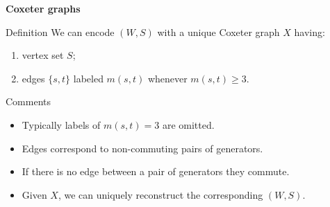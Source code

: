 \documentclass[9pt,handout]{beamer}
\newcommand{\<}{\langle}
\renewcommand{\>}{\rangle}
\begin{document}

\begin{frame}{\textbf{Coxeter graphs}}

\begin{block}{Definition}
We can encode $(W,S)$ with a unique \alert{Coxeter graph} $X$ having: 

\begin{enumerate}
\item vertex set $S$;
\item edges $\{s,t\}$ labeled $m(s,t)$ whenever $m(s,t)\geq 3$.
\end{enumerate}
\end{block}

\pause

\begin{block}{Comments}

\begin{itemize}

\item Typically labels of $m(s,t)=3$ are omitted.

\item Edges correspond to non-commuting pairs of generators.

\item If there is no edge between a pair of generators they commute.

\item Given $X$, we can uniquely reconstruct the corresponding $(W,S)$.

\end{itemize}

\end{block}

\end{frame}

\end{document}

